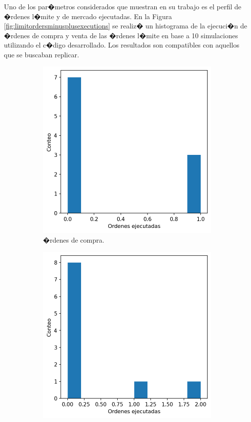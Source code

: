 \documentclass[12pt,a4paper,spanish]{article}%
\begin{document}
Uno de los par�metros considerados que \cite{Cartea2019} muestran en su trabajo es el perfil de �rdenes l�mite y de mercado ejecutadas. En la Figura \ref{fig:limitordersminusplusexecutions} se realiz� un histograma de la ejecuci�n de �rdenes de compra y venta de las �rdenes l�mite en base a 10 simulaciones utilizando el c�digo desarrollado. Los resultados son compatibles con aquellos que se buscaban replicar.
\begin{figure}[H]
	\centering
\begin{subfigure}{0.45\textwidth}
	\includegraphics[width=1\linewidth]{figuras/market_orders_minus_executions_final}
	\caption{�rdenes de compra.}
\end{subfigure}
\hfill
\begin{subfigure}{0.45\textwidth}
	\includegraphics[width=1\linewidth]{figuras/market_orders_plus_executions_final}

\end{subfigure}
\end{figure}
\end{document}
